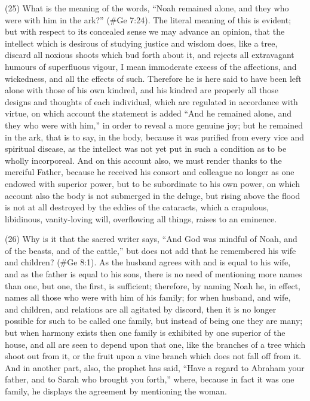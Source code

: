 (25) What is the meaning of the words, ``Noah remained alone, and they who were with him in the
ark?'' (\#Ge 7:24). The literal meaning of this is evident; but with respect to its concealed sense
we may advance an opinion, that the intellect which is desirous of studying justice and wisdom
does, like a tree, discard all noxious shoots which bud forth about it, and rejects all extravagant
humours of superfluous vigour, I mean immoderate excess of the affections, and wickedness, and
all the effects of such. Therefore he is here said to have been left alone with those of his own
kindred, and his kindred are properly all those designs and thoughts of each individual, which are
regulated in accordance with virtue, on which account the statement is added ``And he remained
alone, and they who were with him,'' in order to reveal a more genuine joy; but he remained in the
ark, that is to say, in the body, because it was purified from every vice and spiritual disease, as the
intellect was not yet put in such a condition as to be wholly incorporeal. And on this account also,
we must render thanks to the merciful Father, because he received his consort and colleague no
longer as one endowed with superior power, but to be subordinate to his own power, on which
account also the body is not submerged in the deluge, but rising above the flood is not at all
destroyed by the eddies of the cataracts, which a crapulous, libidinous, vanity-loving will,
overflowing all things, raises to an eminence.

(26) Why is it that the sacred writer says, ``And God was mindful of Noah, and of the beasts, and of
the cattle,'' but does not add that he remembered his wife and children? (\#Ge 8:1). As the
husband agrees with and is equal to his wife, and as the father is equal to his sons, there is no
need of mentioning more names than one, but one, the first, is sufficient; therefore, by naming
Noah he, in effect, names all those who were with him of his family; for when husband, and wife,
and children, and relations are all agitated by discord, then it is no longer possible for such to be
called one family, but instead of being one they are many; but when harmony exists then one family
is exhibited by one superior of the house, and all are seen to depend upon that one, like the
branches of a tree which shoot out from it, or the fruit upon a vine branch which does not fall off
from it. And in another part, also, the prophet has said, ``Have a regard to Abraham your father,
and to Sarah who brought you forth,'' where, because in fact it was one family, he displays the
agreement by mentioning the woman.

